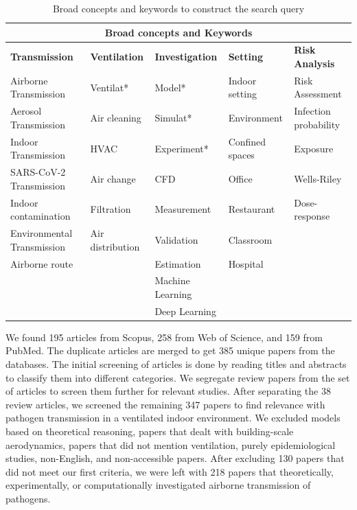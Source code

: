 \documentclass[preprint,12pt]{elsarticle}
\begin{document}
{\renewcommand{\arraystretch}{1.1}
\begin{table}
    \begin{tabularx}{\textwidth}{|p{2.5cm}|X|p{2.5cm}|X|X|}
    \hline
    \multicolumn{5}{|c|}{\textbf{Broad concepts and Keywords}} \\
    \hline
    \textbf{Transmission} & \textbf{Ventilation} & \textbf{Investigation} & \textbf{Setting} & \textbf{Risk Analysis}\\
    \hline
    Airborne Transmission & Ventilat* & Model* & Indoor setting & Risk Assessment \\
    Aerosol Transmission & Air cleaning & Simulat* & Environment & Infection probability\\
    Indoor Transmission & HVAC & Experiment* & Confined spaces & Exposure \\         
    SARS-CoV-2 Transmission & Air change  & CFD & Office  & Wells-Riley\\        
    Indoor contamination & Filtration & Measurement & Restaurant & Dose-response\\        
    Environmental Transmission & Air distribution & Validation & Classroom & \\  
    Airborne route &  & Estimation & Hospital & \\
     &  & Machine Learning &  & \\
    &  & Deep Learning &  & \\
    \hline
    \end{tabularx}
    \caption{Broad concepts and keywords to construct the search query}
    \label{tab:keys}
\end{table}
}

We found 195 articles from Scopus, 258 from Web of Science, and 159 from PubMed. The duplicate articles are merged to get 385 unique papers from the databases. The initial screening of articles is done by reading titles and abstracts to classify them into different categories. We segregate review papers from the set of articles to screen them further for relevant studies. After separating the 38 review articles, we screened the remaining 347 papers to find relevance with pathogen transmission in a ventilated indoor environment. We excluded models based on theoretical reasoning, papers that dealt with building-scale aerodynamics, papers that did not mention ventilation, purely epidemiological studies, non-English, and non-accessible papers. After excluding 130 papers that did not meet our first criteria, we were left with 218 papers that theoretically, experimentally, or computationally investigated airborne transmission of pathogens.
\end{document}
